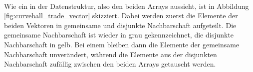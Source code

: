 \\
%
%
%
%
Wie ein \ct{} in der Datenstruktur, also den beiden Arrays aussieht, ist 
in Abbildung \ref{fig:curveball_trade_vector} skizziert. Dabei werden zuerst die Elemente
der beiden Vektoren in gemeinsame und disjunkte Nachbarschaft aufgeteilt. Die gemeinsame Nachbarschaft ist
wieder in grau gekennzeichnet, die disjunkte Nachbarschaft in gelb. Bei einem \ct{} bleiben dann die Elemente 
der gemeinsame Nachbarschaft unverändert, während die Elemente aus der 
disjunkten Nachbarschaft zufällig zwischen den beiden 
Arrays getauscht werden.



